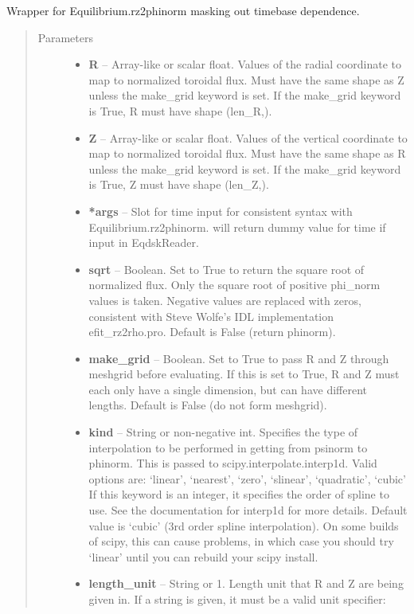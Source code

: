 \documentclass[letterpaper,10pt,english]{sphinxmanual}
\begin{document}
\begin{fulllineitems}
\begin{fulllineitems}
Wrapper for Equilibrium.rz2phinorm masking out timebase dependence.
\begin{quote}\begin{description}
\item[{Parameters}] \leavevmode\begin{itemize}
\item {} 
\textbf{R} -- Array-like or scalar float.
Values of the radial coordinate to
map to normalized toroidal flux. Must have the same shape as Z
unless the make\_grid keyword is set. If the make\_grid keyword
is True, R must have shape (len\_R,).

\item {} 
\textbf{Z} -- Array-like or scalar float.
Values of the vertical coordinate to
map to normalized toroidal flux. Must have the same shape as R
unless the make\_grid keyword is set. If the make\_grid keyword
is True, Z must have shape (len\_Z,).

\item {} 
\textbf{*args} -- Slot for time input for consistent syntax with Equilibrium.rz2phinorm.
will return dummy value for time if input in EqdskReader.

\item {} 
\textbf{sqrt} -- Boolean.
Set to True to return the square root of normalized
flux. Only the square root of positive phi\_norm values is taken.
Negative values are replaced with zeros, consistent with Steve
Wolfe's IDL implementation efit\_rz2rho.pro. Default is False
(return phinorm).

\item {} 
\textbf{make\_grid} -- Boolean.
Set to True to pass R and Z through meshgrid
before evaluating. If this is set to True, R and Z must each
only have a single dimension, but can have different lengths.
Default is False (do not form meshgrid).

\item {} 
\textbf{kind} -- String or non-negative int.
Specifies the type of interpolation
to be performed in getting from psinorm to phinorm. This is
passed to scipy.interpolate.interp1d. Valid options are:
`linear', `nearest', `zero', `slinear', `quadratic', `cubic'
If this keyword is an integer, it specifies the order of spline
to use. See the documentation for interp1d for more details.
Default value is `cubic' (3rd order spline interpolation). On
some builds of scipy, this can cause problems, in which case
you should try `linear' until you can rebuild your scipy install.

\item {} 
\textbf{length\_unit} -- 
String or 1.
Length unit that R and Z are being given
in. If a string is given, it must be a valid unit specifier:


\end{itemize}
\end{description}
\end{quote}
\end{fulllineitems}
\end{fulllineitems}
\end{document}
